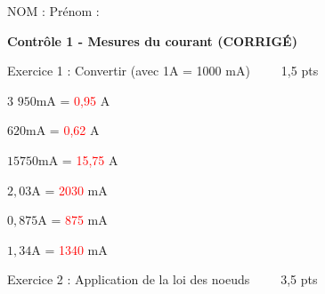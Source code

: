 \documentclass[11pt,a4paper]{article}
\newcommand{\rouge}[1]{\textcolor{red}{#1}}
\begin{document}
\begin{mybox1}
NOM : \hfill Prénom : \hfill ~~
\end{mybox1}

\vfill
\begin{mybox}
\begin{center}
\textbf{\Large Contrôle 1 - Mesures du courant (CORRIGÉ)}
\end{center}
\end{mybox}

\vfill 

\begin{mybox1}
Exercice 1 : Convertir (avec 1A = 1000 mA) ~ \hfill ~~ 1,5 pts
\end{mybox1}

\vspace{3mm}

\begin{multicols}{3}
$950$mA = \rouge{0,95} A 
\vspace{5mm}

$620$mA = \rouge{0,62} A 
\vspace{5mm}

$15750$mA = \rouge{15,75} A 
\vspace{5mm}

$2,03$A = \rouge{2030} mA
\vspace{5mm}

$0,875$A = \rouge{875} mA
\vspace{5mm}

$1,34$A = \rouge{1340} mA
\vspace{5mm}
\end{multicols}

\begin{mybox1}
Exercice 2 : Application de la loi des noeuds ~ \hfill ~~ 3,5 pts
\end{mybox1}
\end{document}
